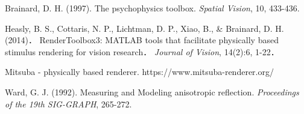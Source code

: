 \begin{thebibliography}{9}%

    Brainard, D. H. (1997).
    The psychophysics toolbox.
    {\it Spatial Vision}, 10, 433-436.

    Heasly, B. S., Cottaris, N. P., Lichtman, D. P., Xiao, B., \& Brainard, D. H. (2014)．
    RenderToolbox3: MATLAB tools that facilitate physically based stimulus rendering for vision research．
    {\it Journal of Vision}, 14(2):6, 1-22．

    Mitsuba - physically based renderer. https://www.mitsuba-renderer.org/

    Ward, G. J. (1992).
    Measuring and Modeling anisotropic reflection.
    {\it Proceedings of the 19th SIG-GRAPH}, 265-272.



\end{thebibliography}
